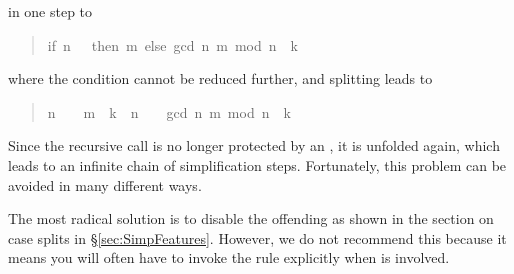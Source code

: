 \begin{isabelle}
\begin{isamarkuptext}
\begin{quote}
\end{quote}
in one step to
\begin{quote}

\begin{isabelle}%
{\isacharparenleft}if\ \mbox{n}\ {\isacharequal}\ \ then\ \mbox{m}\ else\ gcd\ {\isacharparenleft}\mbox{n}{\isacharcomma}\ \mbox{m}\ mod\ \mbox{n}{\isacharparenright}{\isacharparenright}\ {\isacharequal}\ \mbox{k}
\end{isabelle}%

\end{quote}
where the condition cannot be reduced further, and splitting leads to
\begin{quote}

\begin{isabelle}%
{\isacharparenleft}\mbox{n}\ {\isacharequal}\ \ {\isasymlongrightarrow}\ \mbox{m}\ {\isacharequal}\ \mbox{k}{\isacharparenright}\ {\isasymand}\ {\isacharparenleft}\mbox{n}\ {\isasymnoteq}\ \ {\isasymlongrightarrow}\ gcd\ {\isacharparenleft}\mbox{n}{\isacharcomma}\ \mbox{m}\ mod\ \mbox{n}{\isacharparenright}\ {\isacharequal}\ \mbox{k}{\isacharparenright}
\end{isabelle}%

\end{quote}
Since the recursive call  is no longer protected by
an , it is unfolded again, which leads to an infinite chain of
simplification steps. Fortunately, this problem can be avoided in many
different ways.

The most radical solution is to disable the offending
 as shown in the section on case splits in
\S\ref{sec:SimpFeatures}.
However, we do not recommend this because it means you will often have to
invoke the rule explicitly when  is involved.


\end{isamarkuptext}
\end{isabelle}
